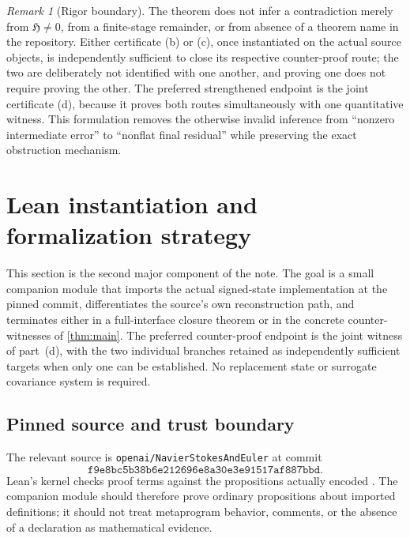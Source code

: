 \documentclass[12pt]{article}
\theoremstyle{plain}
\theoremstyle{definition}
\theoremstyle{remark}
\newtheorem{remark}[theorem]{Remark}
\newcommand{\Hidden}{\mathfrak H}
\begin{document}
\begin{remark}[Rigor boundary]
The theorem does not infer a contradiction merely from \(\Hidden\neq0\), from a finite-stage remainder, or from absence of a theorem name in the repository. Either certificate (b) or (c), once instantiated on the actual source objects, is independently sufficient to close its respective counter-proof route; the two are deliberately not identified with one another, and proving one does not require proving the other. The preferred strengthened endpoint is the joint certificate (d), because it proves both routes simultaneously with one quantitative witness. This formulation removes the otherwise invalid inference from ``nonzero intermediate error'' to ``nonflat final residual'' while preserving the exact obstruction mechanism.
\end{remark}

\section{Lean instantiation and formalization strategy}\label{sec:lean-instantiation}
This section is the second major component of the note. The goal is a small companion module that imports the actual signed-state implementation at the pinned commit, differentiates the source's own reconstruction path, and terminates either in a full-interface closure theorem or in the concrete counter-witnesses of \cref{thm:main}. The preferred counter-proof endpoint is the joint witness of part~(d), with the two individual branches retained as independently sufficient targets when only one can be established. No replacement state or surrogate covariance system is required.

\subsection{Pinned source and trust boundary}
The relevant source is \texttt{openai/NavierStokesAndEuler} at commit
\[
\texttt{f9e8bc5b38b6e212696e8a30e3e91517af887bbd}.
\]
Lean's kernel checks proof terms against the propositions actually encoded \cite{deMouraEtAl2015,Lean4Reference}. The companion module should therefore prove ordinary propositions about imported definitions; it should not treat metaprogram behavior, comments, or the absence of a declaration as mathematical evidence.
\end{document}
